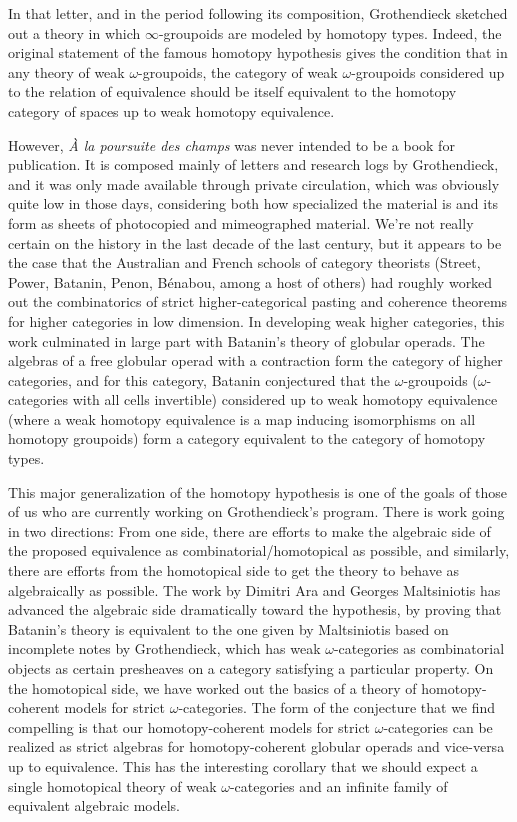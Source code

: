 \documentclass[a4paper,9pt]{amsart}
\theoremstyle{plain}   %
\theoremstyle{remark}
\theoremstyle{plain}
\begin{document}
In that letter, and in the period following its composition, Grothendieck sketched out a theory in which \(\infty\)-groupoids are modeled by homotopy types.  Indeed, the original statement of the famous homotopy hypothesis gives the condition that in any theory of weak \(\omega\)-groupoids, the category of weak \(\omega\)-groupoids considered up to the relation of equivalence should be itself equivalent to the homotopy category of spaces up to weak homotopy equivalence. 

However, \emph{\`A la poursuite des champs} was never intended to be a book for publication.  It is composed mainly of letters and research logs by Grothendieck, and it was only made available through private circulation, which was obviously quite low in those days, considering both how specialized the material is and its form as sheets of photocopied and mimeographed material.  We're not really certain on the history in the last decade of the last century, but it appears to be the case that the Australian and French schools of category theorists (Street, Power, Batanin, Penon, B\'enabou, among a host of others) had roughly worked out the combinatorics of strict higher-categorical pasting and coherence theorems for higher categories in low dimension.  In developing weak higher categories, this work culminated in large part with Batanin's theory of globular operads.  The algebras of a free globular operad with a contraction form the category of higher categories, and for this category, Batanin conjectured that the \(\omega\)-groupoids (\(\omega\)-categories with all cells invertible) considered up to weak homotopy equivalence (where a weak homotopy equivalence is a map inducing isomorphisms on all homotopy groupoids) form a category equivalent to the category of homotopy types.  

This major generalization of the homotopy hypothesis is one of the goals of those of us who are currently working on Grothendieck's program.  There is work going in two directions: From one side, there are efforts to make the algebraic side of the proposed equivalence as combinatorial/homotopical as possible, and similarly, there are efforts from the homotopical side to get the theory to behave as algebraically as possible.  The work by Dimitri Ara and Georges Maltsiniotis has advanced the algebraic side dramatically toward the hypothesis, by proving that Batanin's theory is equivalent to the one given by Maltsiniotis based on incomplete notes by Grothendieck, which has weak \(\omega\)-categories as combinatorial objects as certain presheaves on a category satisfying a particular property.  On the homotopical side, we have worked out the basics of a theory of homotopy-coherent models for strict \(\omega\)-categories.  The form of the conjecture that we find compelling is that our homotopy-coherent models for strict \(\omega\)-categories can be realized as strict algebras for homotopy-coherent globular operads and vice-versa up to equivalence.  This has the interesting corollary that we should expect a single homotopical theory of weak \(\omega\)-categories and an infinite family of equivalent algebraic models.  
\end{document}
